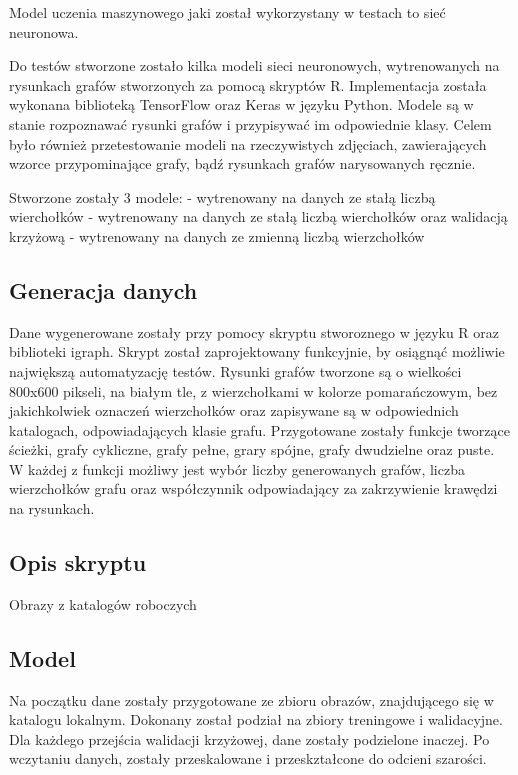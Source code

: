 Model uczenia maszynowego jaki został wykorzystany w testach to sieć neuronowa.

Do testów stworzone zostało kilka modeli sieci neuronowych,
wytrenowanych na rysunkach grafów stworzonych za pomocą skryptów R.
Implementacja została wykonana biblioteką TensorFlow oraz Keras w języku Python.
Modele są w stanie rozpoznawać rysunki grafów i przypisywać im odpowiednie klasy.
Celem było również przetestowanie modeli na rzeczywistych zdjęciach,
zawierających wzorce przypominające grafy, bądź rysunkach grafów narysowanych ręcznie.

Stworzone zostały 3 modele:
- wytrenowany na danych ze stałą liczbą wierchołków
- wytrenowany na danych ze stałą liczbą wierchołków oraz walidacją krzyżową
- wytrenowany na danych ze zmienną liczbą wierzchołków

\subsection{Generacja danych}
Dane wygenerowane zostały przy pomocy skryptu stworoznego w języku R oraz biblioteki igraph.
Skrypt został zaprojektowany funkcyjnie, by osiągnąć możliwie największą automatyzację testów.
Rysunki grafów tworzone są o wielkości 800x600 pikseli, na białym tle, z wierzchołkami w kolorze pomarańczowym,
bez jakichkolwiek oznaczeń wierzchołków oraz zapisywane są w odpowiednich katalogach, odpowiadających klasie grafu.
Przygotowane zostały funkcje tworzące ścieżki, grafy cykliczne, grafy pełne, grary spójne, grafy dwudzielne oraz puste.
W każdej z funkcji możliwy jest wybór liczby generowanych grafów, liczba wierzchołków grafu
oraz współczynnik odpowiadający za zakrzywienie krawędzi na rysunkach.

\subsection{Opis skryptu}
Obrazy z katalogów roboczych 

\subsection{Model}
Na początku dane zostały przygotowane ze zbioru obrazów, znajdującego się w katalogu lokalnym.
Dokonany został podział na zbiory treningowe i walidacyjne.
Dla każdego przejścia walidacji krzyżowej, dane zostały podzielone inaczej.
Po wczytaniu danych, zostały przeskalowane i przeskztałcone do odcieni szarości.

